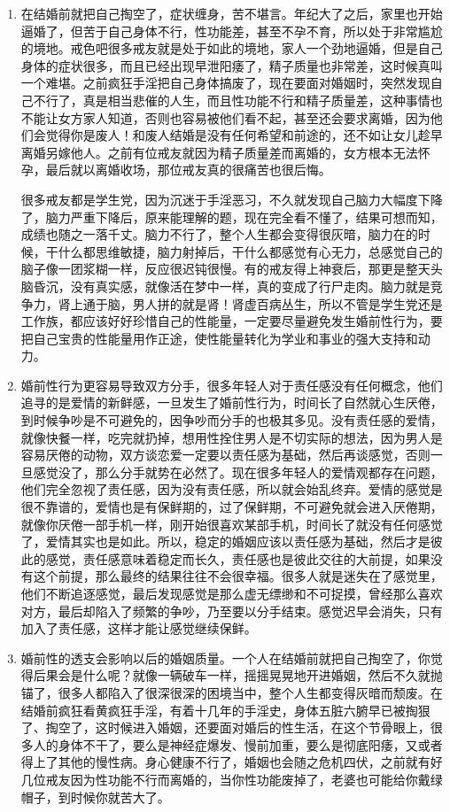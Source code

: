 \documentclass{ctexart}
\begin{document}
\begin{enumerate}
    \item 在结婚前就把自己掏空了，症状缠身，苦不堪言。年纪大了之后，家里也开始逼婚了，但苦于自己身体不行，性功能差，甚至不孕不育，所以处于非常尴尬的境地。戒色吧很多戒友就是处于如此的境地，家人一个劲地逼婚，但是自己身体的症状很多，而且已经出现早泄阳痿了，精子质量也非常差，这时候真叫一个难堪。之前疯狂手淫把自己身体搞废了，现在要面对婚姻时，突然发现自己不行了，真是相当悲催的人生，而且性功能不行和精子质量差，这种事情也不能让女方家人知道，否则也容易被他们看不起，甚至还会要求离婚，因为他们会觉得你是废人！和废人结婚是没有任何希望和前途的，还不如让女儿趁早离婚另嫁他人。之前有位戒友就因为精子质量差而离婚的，女方根本无法怀孕，最后就以离婚收场，那位戒友真的很痛苦也很后悔。

          很多戒友都是学生党，因为沉迷于手淫恶习，不久就发现自己脑力大幅度下降了，脑力严重下降后，原来能理解的题，现在完全看不懂了，结果可想而知，成绩也随之一落千丈。脑力不行了，整个人生都会变得很灰暗，脑力在的时候，干什么都思维敏捷，脑力射掉后，干什么都感觉有心无力，总感觉自己的脑子像一团浆糊一样，反应很迟钝很慢。有的戒友得上神衰后，那更是整天头脑昏沉，没有真实感，就像活在梦中一样，真的变成了行尸走肉。脑力就是竞争力，肾上通于脑，男人拼的就是肾！肾虚百病丛生，所以不管是学生党还是工作族，都应该好好珍惜自己的性能量，一定要尽量避免发生婚前性行为，要把自己宝贵的性能量用作正途，使性能量转化为学业和事业的强大支持和动力。
    \item 婚前性行为更容易导致双方分手，很多年轻人对于责任感没有任何概念，他们追寻的是爱情的新鲜感，一旦发生了婚前性行为，时间长了自然就心生厌倦，到时候争吵是不可避免的，因争吵而分手的也极其多见。没有责任感的爱情，就像快餐一样，吃完就扔掉，想用性拴住男人是不切实际的想法，因为男人是容易厌倦的动物，双方谈恋爱一定要以责任感为基础，然后再谈感觉，否则一旦感觉没了，那么分手就势在必然了。现在很多年轻人的爱情观都存在问题，他们完全忽视了责任感，因为没有责任感，所以就会始乱终弃。爱情的感觉是很不靠谱的，爱情也是有保鲜期的，过了保鲜期，不可避免就会进入厌倦期，就像你厌倦一部手机一样，刚开始很喜欢某部手机，时间长了就没有任何感觉了，爱情其实也是如此。所以，稳定的婚姻应该以责任感为基础，然后才是彼此的感觉，责任感意味着稳定而长久，责任感也是彼此交往的大前提，如果没有这个前提，那么最终的结果往往不会很幸福。很多人就是迷失在了感觉里，他们不断追逐感觉，最后发现感觉是那么虚无缥缈和不可捉摸，曾经那么喜欢对方，最后却陷入了频繁的争吵，乃至要以分手结束。感觉迟早会消失，只有加入了责任感，这样才能让感觉继续保鲜。
    \item 婚前性的透支会影响以后的婚姻质量。一个人在结婚前就把自己掏空了，你觉得后果会是什么呢？就像一辆破车一样，摇摇晃晃地开进婚姻，然后不久就抛锚了，很多人都陷入了很深很深的困境当中，整个人生都变得灰暗而颓废。在结婚前疯狂看黄疯狂手淫，有着十几年的手淫史，身体五脏六腑早已被掏狠了、掏空了，这时候进入婚姻，还要面对婚后的性生活，在这个节骨眼上，很多人的身体不干了，要么是神经症爆发、慢前加重，要么是彻底阳痿，又或者得上了其他的慢性病。身心健康不行了，婚姻也会随之危机四伏，之前就有好几位戒友因为性功能不行而离婚的，当你性功能废掉了，老婆也可能给你戴绿帽子，到时候你就苦大了。

\end{enumerate}
\end{document}
